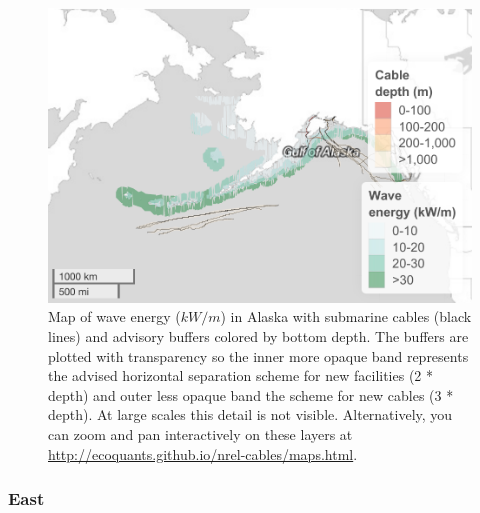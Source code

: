 \documentclass[]{article}
\begin{document}
\begin{figure}
\centering
\includegraphics{report_files/figure-latex/mapWaveAlaska-1.pdf}
\caption{\label{fig:mapWaveAlaska}Map of wave energy (\(kW/m\)) in Alaska
with submarine cables (black lines) and advisory buffers colored by
bottom depth. The buffers are plotted with transparency so the inner
more opaque band represents the advised horizontal separation scheme for
new facilities (2 * depth) and outer less opaque band the scheme for new
cables (3 * depth). At large scales this detail is not visible.
Alternatively, you can zoom and pan interactively on these layers at
\url{http://ecoquants.github.io/nrel-cables/maps.html}.}
\end{figure}

\hypertarget{east-1}{%
\subsubsection{East}\label{east-1}}
\end{document}
